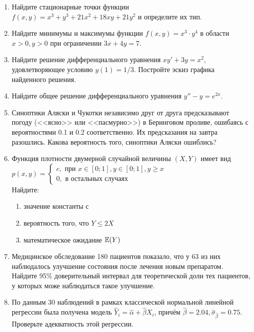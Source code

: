 \documentclass[pdftex,12pt,a4paper]{article}
\begin{document}
\begin{enumerate}
\item Найдите стационарные точки функции $f(x,y)=x^3+y^3+21x^2+18xy+21y^2$ и определите их тип.\\
\item Найдите минимумы и максимумы функции $f(x,y)=x^3\cdot y^4$ в области $x>0,y>0$ при ограничении $3x+4y=7$.\\
\item Найдите решение дифференциального уравнения $xy'+3y=x^2$, удовлетворяющее условию $y(1)=1/3$. Постройте эскиз графика найденного решения. \\
\item Найдите общее решение дифференциального уравнения $y''-y=e^{2x}$.\\
\item Синоптики Аляски и Чукотки независимо друг от друга предсказывают погоду (<<ясно>> или <<пасмурно>>) в Беринговом проливе, ошибаясь с вероятностями 0.1 и 0.2 соответственно. Их предсказания на завтра разошлись. Какова вероятность того, синоптики Аляски ошиблись?\\
\item Функция плотности двумерной случайной величины $(X,Y)$ имеет вид\\
$p(x,y)=\begin{cases}
c,\text{ при } x\in [0;1],y \in [0;1], y\geq x\\
0,\text{ в остальных случаях }
\end{cases}$\\
Найдите:
\begin{enumerate}
\item значение константы с
\item вероятность того, что $Y\leq 2X$
\item математическое ожидание $\mathbb{E}(Y)$
\end{enumerate}
\item Медицинское обследование 180 пациентов показало, что у 63 из них наблюдалось улучшение состояния после лечения новым препаратом. Найдите 95\% доверительный интервал для теоретической доли тех пациентов, у которых може наблюдаться такое улучшение.\\
\item По данным 30 наблюдений в рамках классической нормальной линейной регрессии была получена модель $\hat{Y}_i=\hat{\alpha}+\hat{\beta}X_i$, причём $\hat{\beta}=2.04, \hat{\sigma}_{\hat{\beta}}=0.75$. Проверьте адекватность этой регрессии.
\end{enumerate}
\end{document}
